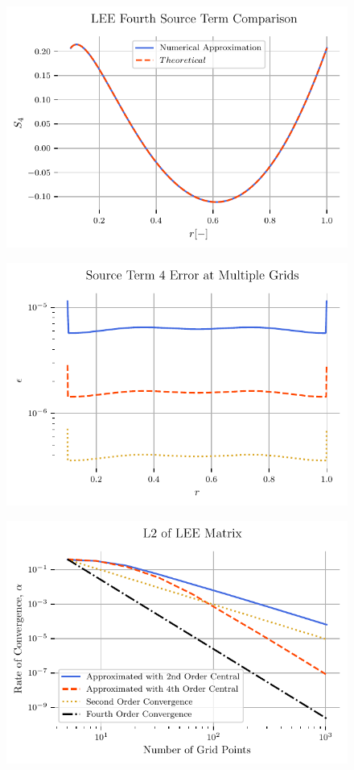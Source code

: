 \documentclass{article}
\begin{document}
\begin{figure}
    \centering
    \includegraphics[width=\textwidth]{tex-outputs/SourceTermComparison4.pdf}
\end{figure}

\begin{figure}
    \centering
    \includegraphics[width=\textwidth]{tex-outputs/SourceTermError4.pdf}
\end{figure}

\begin{figure}
    \centering
    \includegraphics[width=\textwidth]{tex-outputs/LEE_L2.pdf}
\end{figure}
\end{document}
